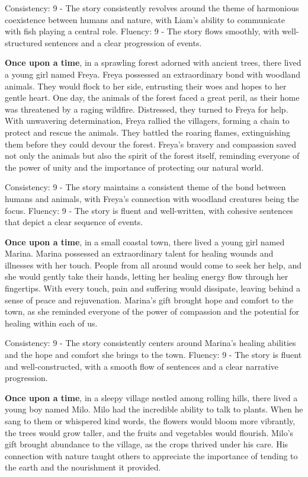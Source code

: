 \documentclass{article}
\begin{document}
Consistency: 9 - The story consistently revolves around the theme of harmonious coexistence between humans and nature, with Liam's ability to communicate with fish playing a central role.
Fluency: 9 - The story flows smoothly, with well-structured sentences and a clear progression of events.

\textbf{Once upon a time}, in a sprawling forest adorned with ancient trees, there lived a young girl named Freya. Freya possessed an extraordinary bond with woodland animals. They would flock to her side, entrusting their woes and hopes to her gentle heart. One day, the animals of the forest faced a great peril, as their home was threatened by a raging wildfire. Distressed, they turned to Freya for help. With unwavering determination, Freya rallied the villagers, forming a chain to protect and rescue the animals. They battled the roaring flames, extinguishing them before they could devour the forest. Freya's bravery and compassion saved not only the animals but also the spirit of the forest itself, reminding everyone of the power of unity and the importance of protecting our natural world.

Consistency: 9 - The story maintains a consistent theme of the bond between humans and animals, with Freya's connection with woodland creatures being the focus.
Fluency: 9 - The story is fluent and well-written, with cohesive sentences that depict a clear sequence of events.

\textbf{Once upon a time}, in a small coastal town, there lived a young girl named Marina. Marina possessed an extraordinary talent for healing wounds and illnesses with her touch. People from all around would come to seek her help, and she would gently take their hands, letting her healing energy flow through her fingertips. With every touch, pain and suffering would dissipate, leaving behind a sense of peace and rejuvenation. Marina's gift brought hope and comfort to the town, as she reminded everyone of the power of compassion and the potential for healing within each of us.

Consistency: 9 - The story consistently centers around Marina's healing abilities and the hope and comfort she brings to the town.
Fluency: 9 - The story is fluent and well-constructed, with a smooth flow of sentences and a clear narrative progression.

\textbf{Once upon a time}, in a sleepy village nestled among rolling hills, there lived a young boy named Milo. Milo had the incredible ability to talk to plants. When he sang to them or whispered kind words, the flowers would bloom more vibrantly, the trees would grow taller, and the fruits and vegetables would flourish. Milo's gift brought abundance to the village, as the crops thrived under his care. His connection with nature taught others to appreciate the importance of tending to the earth and the nourishment it provided.
\end{document}
